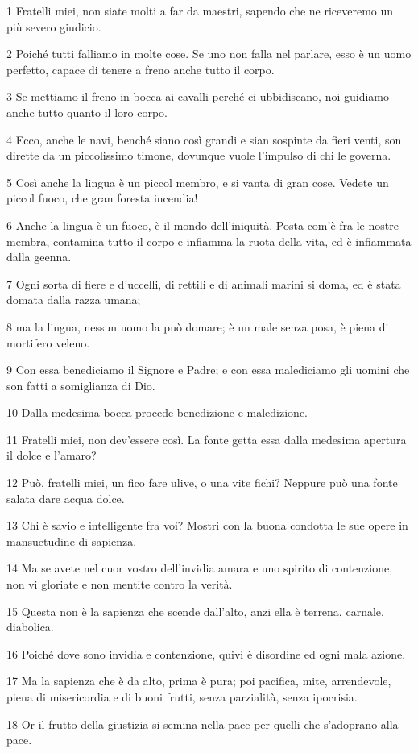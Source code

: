 \par 1 Fratelli miei, non siate molti a far da maestri, sapendo che ne riceveremo un più severo giudicio.
\par 2 Poiché tutti falliamo in molte cose. Se uno non falla nel parlare, esso è un uomo perfetto, capace di tenere a freno anche tutto il corpo.
\par 3 Se mettiamo il freno in bocca ai cavalli perché ci ubbidiscano, noi guidiamo anche tutto quanto il loro corpo.
\par 4 Ecco, anche le navi, benché siano così grandi e sian sospinte da fieri venti, son dirette da un piccolissimo timone, dovunque vuole l'impulso di chi le governa.
\par 5 Così anche la lingua è un piccol membro, e si vanta di gran cose. Vedete un piccol fuoco, che gran foresta incendia!
\par 6 Anche la lingua è un fuoco, è il mondo dell'iniquità. Posta com'è fra le nostre membra, contamina tutto il corpo e infiamma la ruota della vita, ed è infiammata dalla geenna.
\par 7 Ogni sorta di fiere e d'uccelli, di rettili e di animali marini si doma, ed è stata domata dalla razza umana;
\par 8 ma la lingua, nessun uomo la può domare; è un male senza posa, è piena di mortifero veleno.
\par 9 Con essa benediciamo il Signore e Padre; e con essa malediciamo gli uomini che son fatti a somiglianza di Dio.
\par 10 Dalla medesima bocca procede benedizione e maledizione.
\par 11 Fratelli miei, non dev'essere così. La fonte getta essa dalla medesima apertura il dolce e l'amaro?
\par 12 Può, fratelli miei, un fico fare ulive, o una vite fichi? Neppure può una fonte salata dare acqua dolce.
\par 13 Chi è savio e intelligente fra voi? Mostri con la buona condotta le sue opere in mansuetudine di sapienza.
\par 14 Ma se avete nel cuor vostro dell'invidia amara e uno spirito di contenzione, non vi gloriate e non mentite contro la verità.
\par 15 Questa non è la sapienza che scende dall'alto, anzi ella è terrena, carnale, diabolica.
\par 16 Poiché dove sono invidia e contenzione, quivi è disordine ed ogni mala azione.
\par 17 Ma la sapienza che è da alto, prima è pura; poi pacifica, mite, arrendevole, piena di misericordia e di buoni frutti, senza parzialità, senza ipocrisia.
\par 18 Or il frutto della giustizia si semina nella pace per quelli che s'adoprano alla pace.

